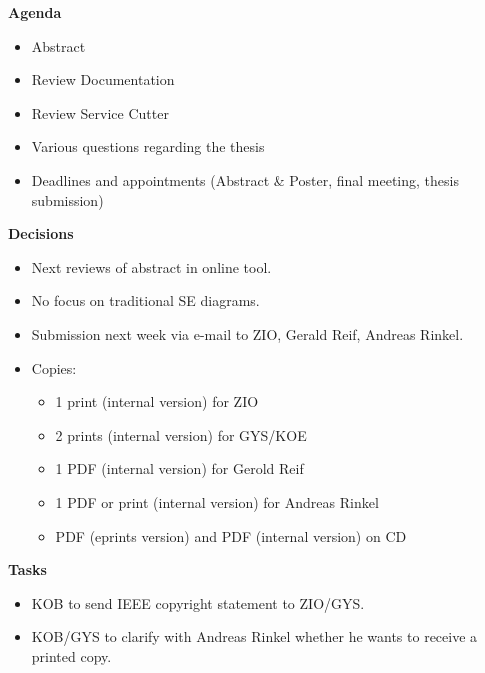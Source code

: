 \textbf{Agenda}

\begin{itemize}
\item Abstract
\item Review Documentation 
\item Review Service Cutter
\item Various questions regarding the thesis
\item Deadlines and appointments (Abstract \& Poster, final meeting, thesis submission)
\end{itemize}

\textbf{Decisions}

\begin{itemize}
\item Next reviews of abstract in online tool.
\item No focus on traditional SE diagrams.
\item Submission next week via e-mail to ZIO, Gerald Reif, Andreas Rinkel.
\item Copies:
	\begin{itemize}
	\item 1 print (internal version) for ZIO
	\item 2 prints (internal version) for GYS/KOE
	\item 1 PDF (internal version) for Gerold Reif
	\item 1 PDF or print (internal version) for Andreas Rinkel
	\item PDF (eprints version) and PDF (internal version) on CD
	\end{itemize}
\end{itemize}

\textbf{Tasks}

\begin{itemize}
\item KOB to send IEEE copyright statement to ZIO/GYS.
\item KOB/GYS to clarify with Andreas Rinkel whether he wants to receive a printed copy.
\end{itemize}
